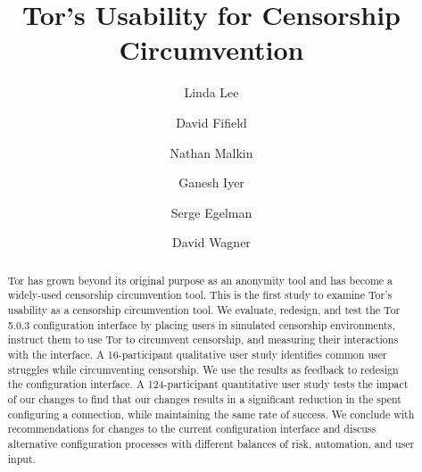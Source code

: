 \documentclass[USenglish,oneside,twocolumn]{article}
\begin{document}
 
  \author*[1]{Linda Lee}

  \author[2]{David Fifield}

  \author[3]{Nathan Malkin}

  \author[4]{Ganesh Iyer}

  \author[5]{Serge Egelman}
  
  \author[6]{David Wagner}




  
   

  \title{\huge Tor's Usability for Censorship Circumvention}



  \begin{abstract}
{Tor has grown beyond its original purpose as an anonymity tool and has 
become a widely-used censorship circumvention tool.
This is the first study to examine Tor's usability as a censorship circumvention tool.
We evaluate, redesign, and test the Tor 5.0.3 configuration interface by
placing users in simulated censorship environments, instruct them to use Tor
to circumvent censorship, and measuring their interactions with the interface.
A 16-participant qualitative user study identifies common user struggles while circumventing censorship.
We use the results as feedback to redesign the configuration interface.
A 124-participant quantitative user study tests the impact of our changes
to find that our changes results in a significant reduction 
in the spent configuring a connection, while maintaining the same rate of success. We
conclude with recommendations for changes to the current configuration interface and discuss
alternative configuration processes with different balances of risk, automation, and user input.}
\end{abstract}
\end{document}
